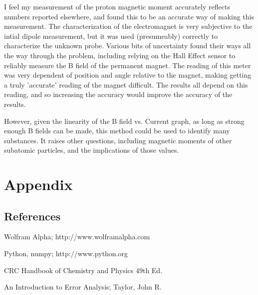 \documentclass[twocolumn]{article}
\begin{document}
I feel my measurement of the proton magnetic moment accurately reflects numbers reported elsewhere, and found this to be
an accurate way of making this measurement. The characterization of the electromagnet is very subjective to the intial dipole
measurement, but it was used (presumeably) correctly to characterize the unknown probe. Various bits of uncertainty found their ways
all the way through the problem, including relying on the Hall Effect sensor to reliably measure the B field of the permanent magnet.
The reading of this meter was very dependent of position and angle relative to the magnet, making getting a truly 'accurate' reading of
the magnet difficult. The results all depend on this reading, and so increasing the accuracy would improve the accuracy of the results.

However, given the linearity of the B field vs. Current graph, as long as strong enough B fields can be made, this method could be used
to identify many substances. It raises other questions, including magnetic moments of other subatomic particles, and the implications
of those values.

\section*{Appendix}
\subsection*{References}
Wolfram Alpha; http://www.wolframalpha.com

Python, numpy; http://www.python.org

CRC Handbook of Chemistry and Physics 49th Ed.

An Introduction to Error Analysis; Taylor, John R.

\newpage
\end{document}
